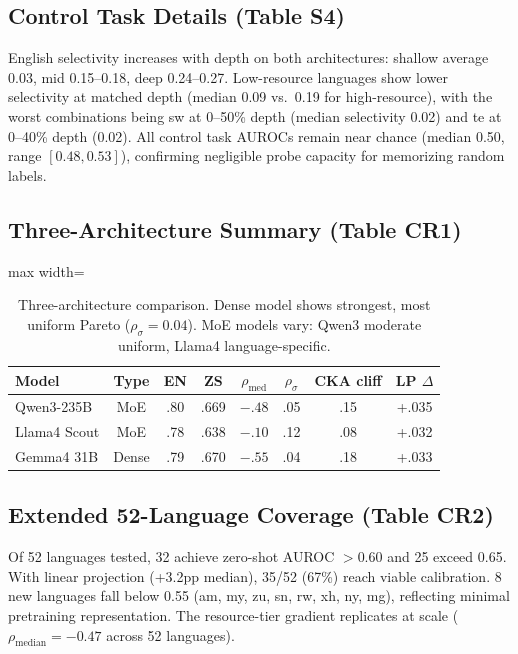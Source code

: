 \documentclass[11pt,a4paper]{article}
\begin{document}
\subsection{Control Task Details (Table S4)}

English selectivity increases with depth on both architectures: shallow average 0.03, mid 0.15--0.18, deep 0.24--0.27.
Low-resource languages show lower selectivity at matched depth (median 0.09 vs.\ 0.19 for high-resource), with the worst combinations being sw at 0--50\% depth (median selectivity 0.02) and te at 0--40\% depth (0.02).
All control task AUROCs remain near chance (median 0.50, range $[0.48, 0.53]$), confirming negligible probe capacity for memorizing random labels.

\subsection{Three-Architecture Summary (Table CR1)}

\begin{table}[h]
\centering
\small
\begin{adjustbox}{max width=\columnwidth}
\begin{tabular}{lccccccc}
\toprule
\textbf{Model} & \textbf{Type} & \textbf{EN} & \textbf{ZS} & $\rho_{\text{med}}$ & $\rho_{\sigma}$ & \textbf{CKA cliff} & \textbf{LP $\Delta$} \\
\midrule
Qwen3-235B & MoE & .80 & .669 & $-.48$ & .05 & .15 & +.035 \\
Llama4 Scout & MoE & .78 & .638 & $-.10$ & .12 & .08 & +.032 \\
Gemma4 31B & Dense & .79 & .670 & $-.55$ & .04 & .18 & +.033 \\
\bottomrule
\end{tabular}
\end{adjustbox}
\caption{Three-architecture comparison. Dense model shows strongest, most uniform Pareto ($\rho_\sigma = 0.04$). MoE models vary: Qwen3 moderate uniform, Llama4 language-specific.}
\label{tab:three_arch}
\end{table}

\subsection{Extended 52-Language Coverage (Table CR2)}

Of 52 languages tested, 32 achieve zero-shot AUROC $> 0.60$ and 25 exceed 0.65.
With linear projection (+3.2pp median), 35/52 (67\%) reach viable calibration.
8 new languages fall below 0.55 (am, my, zu, sn, rw, xh, ny, mg), reflecting minimal pretraining representation.
The resource-tier gradient replicates at scale ($\rho_{\text{median}} = -0.47$ across 52 languages).
\end{document}
